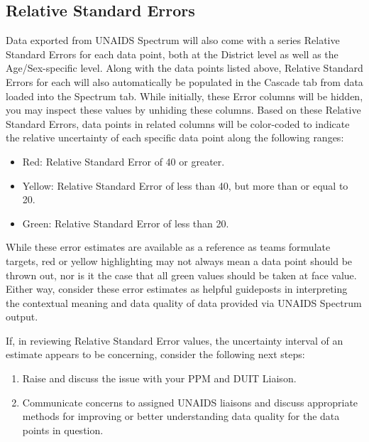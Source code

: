 \documentclass[
  openany]{book}
\begin{document}
\hypertarget{relative-standard-errors}{%
\subsection{Relative Standard Errors}\label{relative-standard-errors}}

Data exported from UNAIDS Spectrum will also come with a series Relative
Standard Errors for each data point, both at the District level as well
as the Age/Sex-specific level. Along with the data points listed above,
Relative Standard Errors for each will also automatically be populated
in the Cascade tab from data loaded into the Spectrum tab. While
initially, these Error columns will be hidden, you may inspect these
values by unhiding these columns. Based on these Relative Standard
Errors, data points in related columns will be color-coded to indicate
the relative uncertainty of each specific data point along the following
ranges:

\begin{itemize}
\item
  Red: Relative Standard Error of 40 or greater.
\item
  Yellow: Relative Standard Error of less than 40, but more than or
  equal to 20.
\item
  Green: Relative Standard Error of less than 20.
\end{itemize}

While these error estimates are available as a reference as teams
formulate targets, red or yellow highlighting may not always mean a data
point should be thrown out, nor is it the case that all green values
should be taken at face value. Either way, consider these error
estimates as helpful guideposts in interpreting the contextual meaning
and data quality of data provided via UNAIDS Spectrum output.

If, in reviewing Relative Standard Error values, the uncertainty
interval of an estimate appears to be concerning, consider the following
next steps:

\begin{enumerate}
\def\labelenumi{\arabic{enumi}.}
\item
  Raise and discuss the issue with your PPM and DUIT Liaison.
\item
  Communicate concerns to assigned UNAIDS liaisons and discuss
  appropriate methods for improving or better understanding data
  quality for the data points in question.
\end{enumerate}
\end{document}
